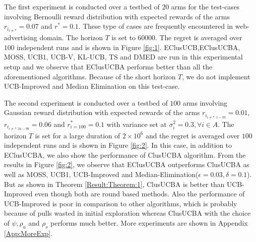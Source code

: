The first experiment is conducted over a testbed of $20$ arms for the test-cases involving Bernoulli reward distribution with expected rewards of the arms $r_{i_{{i}\neq {*}}}=0.07$ and $r^{*}=0.1$. These type of cases are frequently encountered in web-advertising domain. The horizon $T$ is set to $60000$. 
The regret is averaged over $100$ independent runs and is shown in Figure \ref{fig:1}. EClusUCB,EClusUCBA, MOSS, UCB1, UCB-V, KL-UCB, TS and DMED are run in this experimental setup and we observe that EClusUCBA performs better than all the aforementioned algorithms. Because of the short horizon $T$, we do not implement UCB-Improved and Median Elimination on this test-case. 

	The second experiment is conducted over a testbed of $100$ arms involving Gaussian reward distribution with expected rewards of the arms $r_{i_{{i}\neq {*}:1-33}}=0.01$, $r_{i_{{i}\neq {*}:34-99}}=0.06$ and $r^{*}_{i=100}=0.1$ with variance set at $\sigma_{i}^{2} = 0.3,\forall i\in A$. The horizon $T$ is set for a large duration of $2\times 10^{6}$ and the regret is averaged over $100$ independent runs and is shown in Figure \ref{fig:2}. In this case, in addition to EClusUCBA, we also show the performance of ClusUCBA algorithm. From the results in Figure \ref{fig:2}, we observe that EClusUCBA outperforms ClusUCBA as well as MOSS, UCB1, UCB-Improved and Median-Elimination($\epsilon=0.03,\delta=0.1$). But as shown in Theorem \ref{Result:Theorem:1}, ClusUCBA is better than UCB-Improved even though both are round based methods. Also the performance of UCB-Improved is poor in comparison to other algorithms, which is probably because of pulls wasted in initial exploration whereas ClusUCBA with the choice of $\psi, \rho_{a}$ and $\rho_{s}$ performs much better. More experiments are shown in Appendix \ref{App:MoreExp}.

